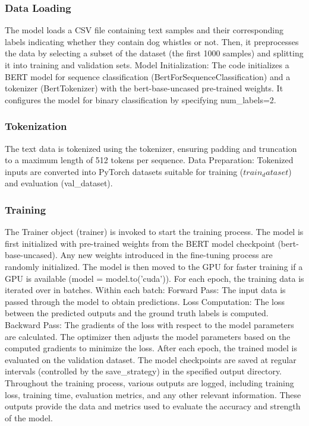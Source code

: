 \documentclass[11pt,a4paper]{article}
\begin{document}
\subsubsection{Data Loading} The model loads a CSV file containing text samples and their corresponding labels indicating whether they contain dog whistles or not. Then, it preprocesses the data by selecting a subset of the dataset (the first 1000 samples) and splitting it into training and validation sets.
Model Initialization: The code initializes a BERT model for sequence classification (BertForSequenceClassification) and a tokenizer (BertTokenizer) with the bert-base-uncased pre-trained weights. It configures the model for binary classification by specifying num\_labels=2.
\subsubsection{Tokenization} The text data is tokenized using the tokenizer, ensuring padding and truncation to a maximum length of 512 tokens per sequence.
Data Preparation: Tokenized inputs are converted into PyTorch datasets suitable for training ($train_dataset$) and evaluation (val\_dataset).
\subsubsection{Training} The Trainer object (trainer) is invoked to start the training process. The model is first initialized with pre-trained weights from the BERT model checkpoint (bert-base-uncased). Any new weights introduced in the fine-tuning process are randomly initialized. The model is then moved to the GPU for faster training if a GPU is available (model = model.to('cuda')). For each epoch, the training data is iterated over in batches. Within each batch:
Forward Pass: The input data is passed through the model to obtain predictions.
Loss Computation: The loss between the predicted outputs and the ground truth labels is computed.
Backward Pass: The gradients of the loss with respect to the model parameters are calculated.
The optimizer then adjusts the model parameters based on the computed gradients to minimize the loss. After each epoch, the trained model is evaluated on the validation dataset. The model checkpoints are saved at regular intervals (controlled by the save\_strategy) in the specified output directory. Throughout the training process, various outputs are logged, including training loss, training time, evaluation metrics, and any other relevant information. These outputs provide the data and metrics used to evaluate the accuracy and strength of the model.
\end{document}
